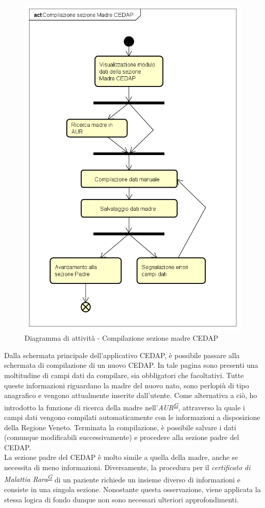 \documentclass[a4paper]{article}
\newcounter{subsubsubsection}[subsubsection]
\begin{document}
\begin{figure}[H]
	\centering
	\includegraphics[width=0.4\linewidth]{uml/sezionemadrecedap.png}
    \caption{Diagramma di attività - Compilazione sezione madre CEDAP}
\end{figure}
Dalla schermata principale dell'applicativo CEDAP, è possibile passare alla schermata di compilazione di un nuovo CEDAP. In tale pagina sono presenti una moltitudine di campi dati da compilare, sia obbligatori che facoltativi. Tutte queste informazioni riguardano la madre del nuovo nato, sono perlopiù di tipo anagrafico e vengono attualmente inserite dall'utente. Come alternativa a ciò, ho introdotto la funzione di ricerca della madre nell'\textit{AUR\textsuperscript{\hyperref[sec:gl]{G}}}, attraverso la quale i campi dati vengono compilati automaticamente con le informazioni a disposizione della Regione Veneto. Terminata la compilazione, è possibile salvare i dati (comunque modificabili successivamente) e procedere alla sezione padre del CEDAP.
\\
La sezione padre del CEDAP è molto simile a quella della madre, anche se necessita di meno informazioni. Diversamente, la procedura per il \textit{certificato di Malattia Rara\textsuperscript{\hyperref[sec:gl]{G}}} di un paziente richiede un insieme diverso di informazioni e consiste in una singola sezione. Nonostante questa osservazione, viene applicata la stessa logica di fondo dunque non sono necessari ulteriori approfondimenti.
\end{document}
